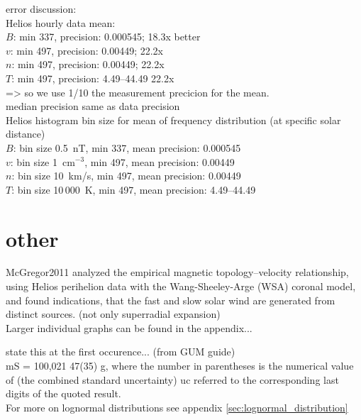 error discussion:\\
Helios hourly data mean:\\
$B$: min 337, precision: 0.000545; 18.3x better\\
$v$: min 497, precision: 0.00449; 22.2x\\
$n$: min 497, precision:  0.00449; 22.2x\\
$T$: min 497, precision: 4.49--44.49 22.2x\\
=> so we use 1/10 the measurement precicion for the mean.\\

median precision same as data precision\\

Helios histogram bin size for mean of frequency distribution (at specific solar distance)\\
$B$: bin size 0.5~nT, min 337, mean precision: 0.000545\\
$v$: bin size 1~cm$^{-3}$, min 497, mean precision: 0.00449\\
$n$: bin size 10~km/s, min 497, mean precision:  0.00449\\
$T$: bin size 10\,000~K, min 497, mean precision: 4.49--44.49\\

\section{other}
McGregor2011 analyzed the empirical magnetic topology–velocity relationship, using Helios perihelion data with the Wang-Sheeley-Arge (WSA) coronal model, and found indications, that the fast and slow solar wind are generated from distinct sources. (not only superradial expansion)\\


Larger individual graphs can be found in the appendix...

state this at the first occurence... (from GUM guide)\\
mS = 100,021 47(35) g, where the number in parentheses is the numerical value of (the combined standard uncertainty) uc referred to the corresponding last digits of the quoted result.\\


For more on lognormal distributions see appendix \autoref{sec:lognormal_distribution}\\

